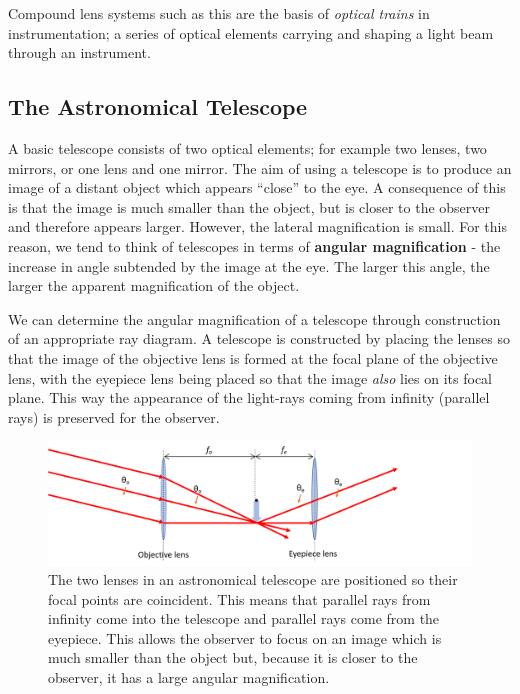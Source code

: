 \documentclass[
]{book}
\begin{document}
Compound lens systems such as this are the basis of \emph{optical trains} in instrumentation; a series of optical elements carrying and shaping a light beam through an instrument.

\hypertarget{sec-ch16-astronomicaltelescope}{%
\subsection{The Astronomical Telescope}\label{sec-ch16-astronomicaltelescope}}

A basic telescope consists of two optical elements; for example two lenses, two mirrors, or one lens and one mirror. The aim of using a telescope is to produce an image of a distant object which appears ``close'' to the eye. A consequence of this is that the image is much smaller than the object, but is closer to the observer and therefore appears larger. However, the lateral magnification is small. For this reason, we tend to think of telescopes in terms of \textbf{angular magnification} - the increase in angle subtended by the image at the eye. The larger this angle, the larger the apparent magnification of the object.

We can determine the angular magnification of a telescope through construction of an appropriate ray diagram. A telescope is constructed by placing the lenses so that the image of the objective lens is formed at the focal plane of the objective lens, with the eyepiece lens being placed so that the image \emph{also} lies on its focal plane. This way the appearance of the light-rays coming from infinity (parallel rays) is preserved for the observer.

\begin{figure}

{\centering \includegraphics[width=0.7\linewidth]{visualisations/LaTeX/ch16-telescopeset1a} 

}

\caption{The two lenses in an astronomical telescope are positioned so their focal points are coincident. This means that parallel rays from infinity come into the telescope and parallel rays come from the eyepiece. This allows the observer to focus on an image which is much smaller than the object but, because it is closer to the observer, it has a large angular magnification.}\label{fig:ch16-telescopeoptics1}
\end{figure}
\end{document}
